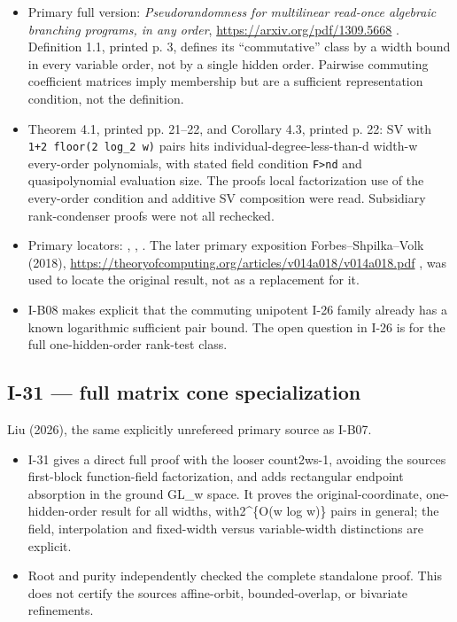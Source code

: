 \documentclass[11pt,a4paper]{article}
\providecommand{\tightlist}{\setlength{\itemsep}{0pt}\setlength{\parskip}{0pt}}
\theoremstyle{definition}\newtheorem{definition}{Definition}
\begin{document}
\begin{itemize}
\tightlist
\item
  Primary full version: \emph{Pseudorandomness for multilinear read-once
  algebraic branching programs, in any order},
  \url{https://arxiv.org/pdf/1309.5668} . Definition 1.1, printed p. 3,
  defines its ``commutative'' class by a width bound in every variable
  order, not by a single hidden order. Pairwise commuting coefficient
  matrices imply membership but are a sufficient representation
  condition, not the definition.
\item
  Theorem 4.1, printed pp. 21--22, and Corollary 4.3, printed p. 22: SV
  with \texttt{1+2\ floor(2\ log\_2\ w)} pairs hits
  individual-degree-less-than-d width-w every-order polynomials, with
  stated field condition \texttt{\textbar{}F\textbar{}\textgreater{}nd}
  and quasipolynomial evaluation size. The proof\textquotesingle s local
  factorization use of the every-order condition and additive SV
  composition were read. Subsidiary rank-condenser proofs were not all
  rechecked.
\item
  Primary locators: , , . The later primary exposition
  Forbes--Shpilka--Volk (2018),
  \url{https://theoryofcomputing.org/articles/v014a018/v014a018.pdf} ,
  was used to locate the original result, not as a replacement for it.
\item
  I-B08 makes explicit that the commuting unipotent I-26 family already
  has a known logarithmic sufficient pair bound. The open question in
  I-26 is for the full one-hidden-order rank-test class.
\end{itemize}

\subsection{I-31 --- full matrix cone
specialization}\label{i-31--full-matrix-cone-specialization}

Liu (2026), the same explicitly unrefereed primary source as I-B07.

\begin{itemize}
\tightlist
\item
  I-31 gives a direct full proof with the looser count2ws-1, avoiding
  the source\textquotesingle s first-block function-field factorization,
  and adds rectangular endpoint absorption in the ground GL\_w space. It
  proves the original-coordinate, one-hidden-order result for all
  widths, with2\^{}\{O(w log w)\} pairs in general; the field,
  interpolation and fixed-width versus variable-width distinctions are
  explicit.
\item
  Root and purity independently checked the complete standalone proof.
  This does not certify the source\textquotesingle s affine-orbit,
  bounded-overlap, or bivariate refinements.
\end{itemize}
\end{document}

